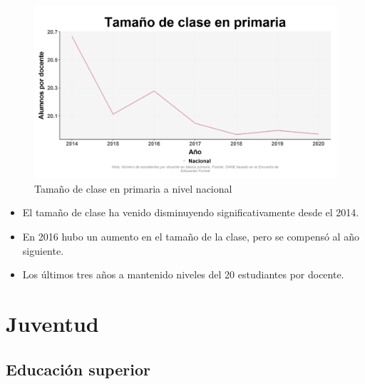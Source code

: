     \begin{figure}[H]
        \caption{Tamaño de clase en primaria a nivel nacional \label{map_result_2} }
        \begin{center}
        \includegraphics[width=\textwidth,keepaspectratio]{img/var_229_trend.png}
        \end{center}
    \end{figure}
            \begin{itemize}
                \item El tamaño de clase ha venido disminuyendo significativamente desde el 2014.
                \item En 2016 hubo un aumento en el tamaño de la clase, pero se compensó al año siguiente.
                \item Los últimos tres años a mantenido niveles del 20 estudiantes por docente.
                \end{itemize}

\section{Juventud}
    \subsection{Educación superior}

